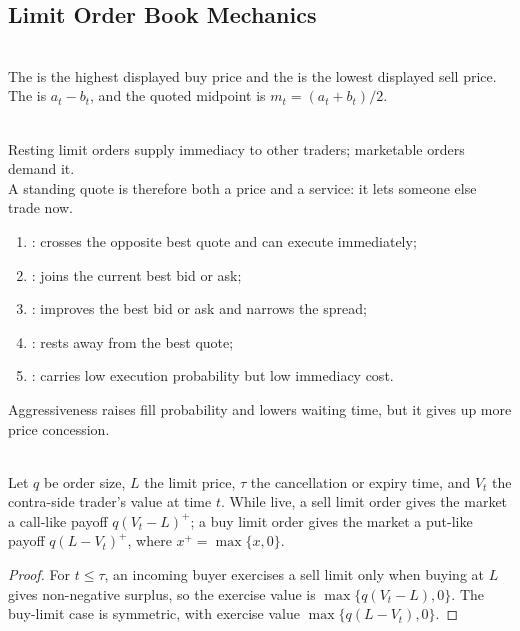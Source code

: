 \subsection{Limit Order Book Mechanics}

\begin{definition} \\
The  is the highest displayed buy price and the  is the lowest displayed sell price. The  is $a_t-b_t$, and the quoted midpoint is $m_t=(a_t+b_t)/2$.
\end{definition}

\begin{principle} \\
Resting limit orders supply immediacy to other traders; marketable orders demand it.\\
A standing quote is therefore both a price and a service: it lets someone else trade now.
\end{principle}

\begin{taxonomy} 
\begin{enumerate}[label=\roman*.]
\setlength{\itemsep}{0pt}
\item {}: crosses the opposite best quote and can execute immediately;
\item {}: joins the current best bid or ask;
\item {}: improves the best bid or ask and narrows the spread;
\item {}: rests away from the best quote;
\item {}: carries low execution probability but low immediacy cost.
\end{enumerate}
Aggressiveness raises fill probability and lowers waiting time, but it gives up more price concession.
\end{taxonomy}

\begin{proposition} \\
Let $q$ be order size, $L$ the limit price, $\tau$ the cancellation or expiry time, and $V_t$ the contra-side trader's value at time $t$. While live, a sell limit order gives the market a call-like payoff $q(V_t-L)^+$; a buy limit order gives the market a put-like payoff $q(L-V_t)^+$, where $x^+=\max\{x,0\}$.
\begin{proof}
For $t\leq\tau$, an incoming buyer exercises a sell limit only when buying at $L$ gives non-negative surplus, so the exercise value is $\max\{q(V_t-L),0\}$. The buy-limit case is symmetric, with exercise value $\max\{q(L-V_t),0\}$.
\end{proof}
\end{proposition}

